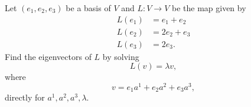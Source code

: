 \begin{exercise}
  \label{ex:hw06:eigenvectors-in-a-basis}
  Let \((e_1,e_2,e_3)\) be a basis of \(V\) and \(L:V\to V\) be the map
  given by
  \[
    \begin{aligned}
      L(e_1)&=e_1+e_2\\
      L(e_2)&=2e_2+e_3\\
      L(e_3)&=2e_3.
    \end{aligned}
  \]
  Find the eigenvectors of \(L\) by solving
  \[
    L(v)=\lambda v,
  \]
  where
  \[
    v=e_1a^1+e_2a^2+e_3a^3,
  \]
  directly for \(a^1,a^2,a^3,\lambda\).
\end{exercise}
